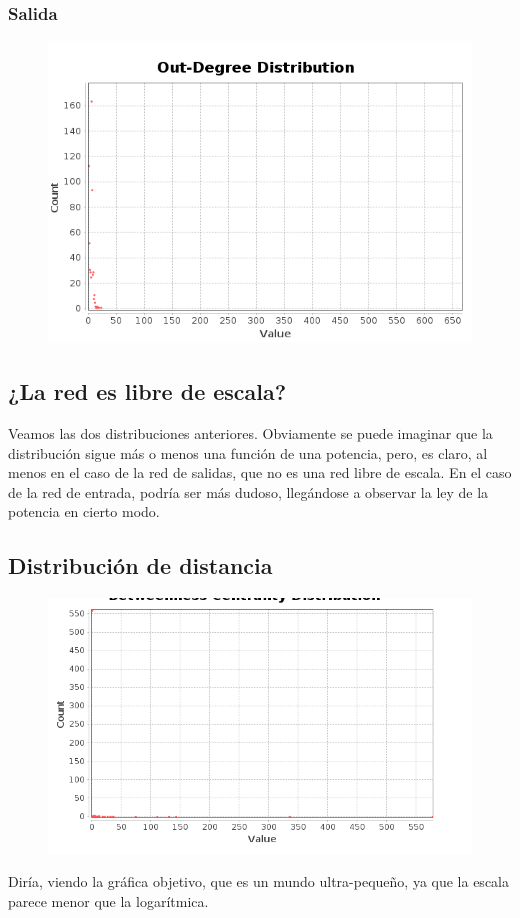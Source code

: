 \subsubsection{Salida}
\begin{figure}[H]
	\centering
	\includegraphics[width=0.6\linewidth]{Imagenes/screenshot006}
\end{figure}

\subsection{¿La red es libre de escala?}

Veamos las dos distribuciones anteriores. Obviamente se puede imaginar que la distribución sigue más o menos una función de una potencia, pero, es claro, al menos en el caso de la red de salidas, que no es una red libre de escala. En el caso de la red de entrada, podría ser más dudoso, llegándose a observar la ley de la potencia en cierto modo.

\subsection{Distribución de distancia}
\begin{figure}[H]
	\centering
	\includegraphics[width=0.6\linewidth]{Imagenes/screenshot008}
\end{figure}

Diría, viendo la gráfica objetivo, que es un mundo ultra-pequeño, ya que la escala parece menor que la logarítmica.

